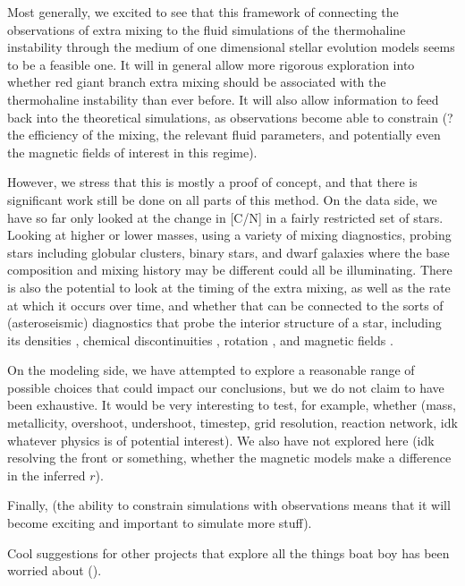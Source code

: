 Most generally, we excited to see that this framework of connecting the observations of extra mixing to the fluid simulations of the thermohaline instability through the medium of one dimensional stellar evolution models seems to be a feasible one. It will in general allow more rigorous exploration into whether red giant branch extra mixing should be associated with the thermohaline instability than ever before. It will also allow information to feed back into the theoretical simulations, as observations become able to constrain (? the efficiency of the mixing, the relevant fluid parameters, and potentially even the magnetic fields of interest in this regime). 

However, we stress that this is mostly a proof of concept, and that there is significant work still be done on all parts of this method. On the data side, we have so far only looked at the change in [C/N] in a fairly restricted set of stars. Looking at higher or lower masses, using a variety of mixing diagnostics, probing stars including globular clusters, binary stars, and dwarf galaxies where the base composition and mixing history may be different could all be illuminating. There is also the potential to look at the timing of the extra mixing, as well as the rate at which it occurs over time, and whether that can be connected to the sorts of (asteroseismic) diagnostics that probe the interior structure of a star, including its densities \citep{KjeldsenBedding1995}, chemical discontinuities \citep{Verma2017}, rotation \citep{Gehan2018}, and magnetic fields \citep{Bugnet2021}. 

On the modeling side, we have attempted to explore a reasonable range of possible choices that could impact our conclusions, but we do not claim to have been exhaustive. It would be very interesting to test, for example, whether
(mass, metallicity, overshoot, undershoot, timestep, grid resolution, reaction network, idk whatever physics is of potential interest). We also have not explored here (idk resolving the front or something, whether the magnetic models make a difference in the inferred $r$).

Finally, (the ability to constrain simulations with observations means that it will become exciting and important to simulate more stuff). 
    
    

    
    
    Cool suggestions for other projects that explore all the things boat boy has been worried about (\partyparrot).

